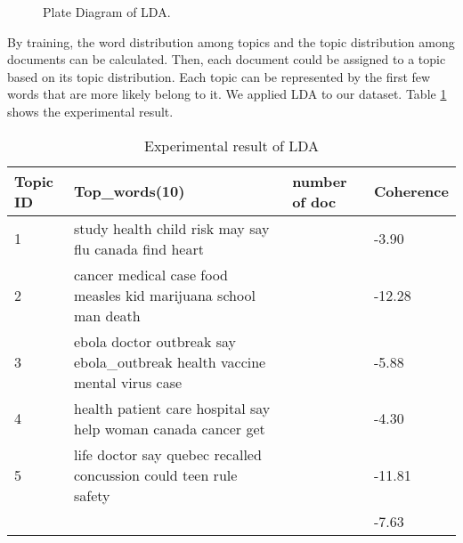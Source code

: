 \begin{figure}[!htp]
    \centering
    \caption{Plate Diagram of LDA.\cite{blei2003latent}}
    \label{fig:lda}
  \end{figure}
By training, the word distribution among topics and the topic distribution among documents can be calculated. Then, each document could be assigned to a topic based on its topic distribution. Each topic can be represented by the first few words that are more likely belong to it. We applied LDA to our dataset. Table \ref{tab:LDA1} shows the experimental result. 
\begin{table}[!htbp]
    \centering
    \hspace{0.5cm}
    \begin{tabular}{|p{45pt}|p{210pt}|p{80pt}|p{50pt}|}
        \hline
        Topic ID & Top\_words(10) & number of doc & Coherence \\ \hline
        1 & study health child risk may say flu canada find heart  & & -3.90\\ \hline
        2 & cancer medical case food measles kid marijuana school man death & & -12.28 \\ \hline
        3 & ebola doctor outbreak say ebola\_outbreak health vaccine mental virus case  & & -5.88 \\ \hline
        4 & health patient care hospital say help woman canada cancer get  & & -4.30 \\ \hline
        5 & life doctor say quebec recalled concussion could teen rule safety  & & -11.81 \\ \hline
        & & & -7.63 \\ \hline
       
    \end{tabular}
    \caption{Experimental result of LDA}
    \label{tab:LDA1}
\end{table}

